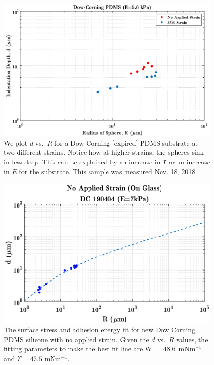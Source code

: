 \begin{figure}[h]
	\centering
	\includegraphics[width=\linewidth]{Chapters/Figures/d_vs_r_stretch_vs_nostretch.pdf}
	\caption[D vs. R Dow-Corning]{We plot $ d $ vs.~$ R $ for a Dow-Corning [expired] PDMS substrate at two different strains. Notice how at higher strains, the spheres sink in less deep. This can be explained by an increase in $\Upsilon$ or an increase in $E$ for the substrate. This sample was measured Nov. 18, 2018.}
	\label{fig:dvsrstretchvsnostretchdc181115}
\end{figure}

\begin{figure}[h]
	\centering
	\includegraphics[width=\linewidth]{Chapters/Figures/WUps_fit_DC190404}
	\caption[Dow Corning W-$\Upsilon $ Fit]{The surface stress and adhesion energy fit for new Dow Corning PDMS silicone with no applied strain. Given the $ d $ vs.~$ R $ values, the fitting parameters to make the best fit line are W $ = 48.6$~mNm$^{-1}$ and  $\Upsilon = 43.5$ mNm$^{-1}$.}
	\label{fig:wupsfitdc190404}
\end{figure}

